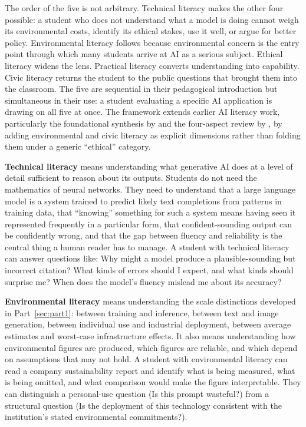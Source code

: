 \documentclass[12pt]{article}
\begin{document}
The order of the five is not arbitrary. Technical literacy makes the other four possible: a student who does not understand what a model is doing cannot weigh its environmental costs, identify its ethical stakes, use it well, or argue for better policy. Environmental literacy follows because environmental concern is the entry point through which many students arrive at AI as a serious subject. Ethical literacy widens the lens. Practical literacy converts understanding into capability. Civic literacy returns the student to the public questions that brought them into the classroom. The five are sequential in their pedagogical introduction but simultaneous in their use: a student evaluating a specific AI application is drawing on all five at once. The framework extends earlier AI literacy work, particularly the foundational synthesis by \textcite{longmagerko2020what} and the four-aspect review by \textcite{ng2021conceptualizing}, by adding environmental and civic literacy as explicit dimensions rather than folding them under a generic ``ethical'' category.

\textbf{Technical literacy} means understanding what generative AI does at a level of detail sufficient to reason about its outputs. Students do not need the mathematics of neural networks. They need to understand that a large language model is a system trained to predict likely text completions from patterns in training data, that ``knowing'' something for such a system means having seen it represented frequently in a particular form, that confident-sounding output can be confidently wrong, and that the gap between fluency and reliability is the central thing a human reader has to manage. A student with technical literacy can answer questions like: Why might a model produce a plausible-sounding but incorrect citation? What kinds of errors should I expect, and what kinds should surprise me? When does the model's fluency mislead me about its accuracy?

\textbf{Environmental literacy} means understanding the scale distinctions developed in Part~\ref{sec:part1}: between training and inference, between text and image generation, between individual use and industrial deployment, between average estimates and worst-case infrastructure effects. It also means understanding how environmental figures are produced, which figures are reliable, and which depend on assumptions that may not hold. A student with environmental literacy can read a company sustainability report and identify what is being measured, what is being omitted, and what comparison would make the figure interpretable. They can distinguish a personal-use question (Is this prompt wasteful?) from a structural question (Is the deployment of this technology consistent with the institution's stated environmental commitments?).
\end{document}
